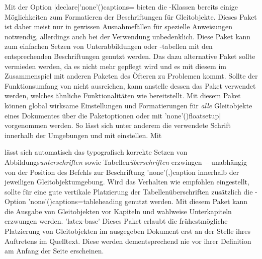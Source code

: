 \begin{DeclarePackages}[Gleitobjekte|?]
  Mit der Option \Option|declare|'none'(){captions=\PMisc} 
  bieten die \KOMAScript-Klassen bereits einige Möglichkeiten zum Formatieren 
  der Beschriftungen für Gleitobjekte. Dieses Paket ist daher meist nur in 
  gewissen Ausnahmefällen für spezielle Anweisungen notwendig, allerdings auch 
  bei der Verwendung unbedenklich.
  Diese Paket kann zum einfachen Setzen von Unterabbildungen oder -tabellen 
  mit den entsprechenden Beschriftungen genutzt werden. Das dazu alternative 
  Paket  sollte vermieden werden, da es nicht mehr gepflegt 
  wird und es mit diesem im Zusammenspiel mit anderen Paketen des Öfteren zu 
  Problemen kommt. Sollte der Funktionsumfang von  nicht 
  ausreichen, kann anstelle dessen das Paket  verwendet 
  werden, welches ähnliche Funktionalitäten wie  bereitstellt.
  Mit diesem Paket können global wirksame Einstellungen und Formatierungen für 
  \emph{alle} Gleitobjekte eines Dokumentes über die Paketoptionen oder mit 
  \Macro'none'(){floatsetup|\MPValue{\dots}} vorgenommen 
  werden. So lässt sich unter anderem die verwendete Schrift innerhalb der 
  Umgebungen  und  mit
   einstellen. Mit 
  \begin{Code}
  \end{Code}\vspace{-\baselineskip}%
  lässt sich automatisch das typografisch korrekte Setzen von 
  Abbildungs\emph{unterschriften} sowie Tabellen\emph{überschriften} 
  erzwingen~-- unabhängig von der Position des Befehls zur Beschriftung 
  \Macro'none'(,){caption} 
  innerhalb der jeweiligen Gleitobjektumgebung. Wird das Verhalten wie 
  empfohlen eingestellt, sollte für eine gute vertikale Platzierung der 
  Tabellenüberschriften zusätzlich die 
  \KOMAScript-Option \Option'none'(){captions=tableheading}
  genutzt werden.
  Mit diesem Paket kann die Ausgabe von Gleitobjekten vor Kapiteln und wahlweise
  Unterkapiteln erzwungen werden.
'latex-base'
  Dieses Paket erlaubt die frühestmögliche Platzierung von Gleitobjekten im 
  ausgegeben Dokument erst an der Stelle ihres Auftretens im Quelltext. Diese 
  werden dementsprechend nie vor ihrer Definition am Anfang der Seite 
  erscheinen.
\end{DeclarePackages}



